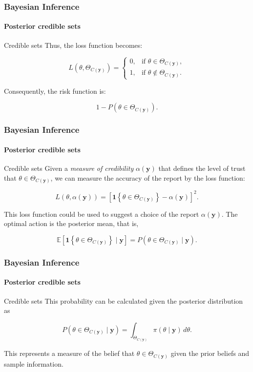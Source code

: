 \documentclass[12pt, compress]{beamer}
\begin{document}
\begin{frame}
	\frametitle{Bayesian Inference}
	\framesubtitle{Posterior credible sets}
	\begin{block}{Credible sets}
		Thus, the loss function becomes:
		
		\[
		L(\theta, \Theta_{C(\mathbf{y})}) =
		\begin{cases}
			0, & \text{if } \theta \in \Theta_{C(\mathbf{y})}, \\
			1, & \text{if } \theta \notin \Theta_{C(\mathbf{y})}.
		\end{cases}
		\]
		
		Consequently, the risk function is:
		
		\[
		1 - P(\theta \in \Theta_{C(\mathbf{y})}).
		\]
		
\end{block}

\end{frame}

\begin{frame}
	\frametitle{Bayesian Inference}
	\framesubtitle{Posterior credible sets}
	\begin{block}{Credible sets}
		Given a \textit{measure of credibility} $\alpha(\mathbf{y})$ that defines the level of trust that $\theta \in \Theta_{C(\mathbf{y})}$, we can measure the accuracy of the report by the loss function:
		
		\[
		L(\theta, \alpha(\mathbf{y})) = \left[\mathbf{1}\left\{\theta \in \Theta_{C(\mathbf{y})}\right\} - \alpha(\mathbf{y})\right]^2.
		\]
		
		This loss function could be used to suggest a choice of the report $\alpha(\mathbf{y})$. The optimal action is the posterior mean, that is,
		
		\[
		\mathbb{E}[\mathbf{1}\left\{\theta \in \Theta_{C(\mathbf{y})}\right\} \mid \mathbf{y}] = P(\theta \in \Theta_{C(\mathbf{y})} \mid \mathbf{y}).
		\]	
	\end{block}
	
\end{frame}


\begin{frame}
	\frametitle{Bayesian Inference}
	\framesubtitle{Posterior credible sets}
	\begin{block}{Credible sets}
		This probability can be calculated given the posterior distribution as
		
		\[
		P(\theta \in \Theta_{C(\mathbf{y})} \mid \mathbf{y}) = \int_{\Theta_{C(\mathbf{y})}} \pi(\theta \mid \mathbf{y}) \, d\theta.
		\]
		
		This represents a measure of the belief that $\theta \in \Theta_{C(\mathbf{y})}$ given the prior beliefs and sample information.
		
	\end{block}
	
\end{frame}
\end{document}
